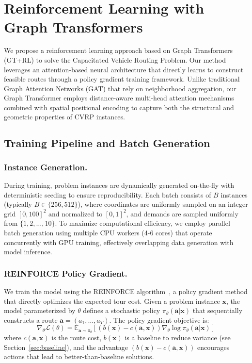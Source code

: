 \section{Reinforcement Learning with Graph Transformers}

We propose a reinforcement learning approach based on Graph Transformers (GT+RL) to solve the Capacitated Vehicle Routing Problem. Our method leverages an attention-based neural architecture that directly learns to construct feasible routes through a policy gradient training framework. Unlike traditional Graph Attention Networks (GAT) that rely on neighborhood aggregation, our Graph Transformer employs distance-aware multi-head attention mechanisms combined with spatial positional encoding to capture both the structural and geometric properties of CVRP instances.

\subsection{Training Pipeline and Batch Generation}

\subsubsection{Instance Generation.} 
During training, problem instances are dynamically generated on-the-fly with deterministic seeding to ensure reproducibility. Each batch consists of $B$ instances (typically $B \in \{256, 512\}$), where coordinates are uniformly sampled on an integer grid $[0, 100]^2$ and normalized to $[0, 1]^2$, and demands are sampled uniformly from $\{1, 2, \ldots, 10\}$. To maximize computational efficiency, we employ parallel batch generation using multiple CPU workers (4-6 cores) that operate concurrently with GPU training, effectively overlapping data generation with model inference.

\subsubsection{REINFORCE Policy Gradient.}
We train the model using the REINFORCE algorithm~\cite{williams1992simple}, a policy gradient method that directly optimizes the expected tour cost. Given a problem instance $\mathbf{x}$, the model parameterized by $\theta$ defines a stochastic policy $\pi_\theta(\mathbf{a}|\mathbf{x})$ that sequentially constructs a route $\mathbf{a} = (a_1, \ldots, a_T)$. The policy gradient objective is:
\begin{equation}
\nabla_\theta \mathcal{L}(\theta) = \mathbb{E}_{\mathbf{a} \sim \pi_\theta} \left[ (b(\mathbf{x}) - c(\mathbf{a}, \mathbf{x})) \nabla_\theta \log \pi_\theta(\mathbf{a}|\mathbf{x}) \right]
\end{equation}
where $c(\mathbf{a}, \mathbf{x})$ is the route cost, $b(\mathbf{x})$ is a baseline to reduce variance (see Section~\ref{sec:baseline}), and the advantage $(b(\mathbf{x}) - c(\mathbf{a}, \mathbf{x}))$ encourages actions that lead to better-than-baseline solutions.

